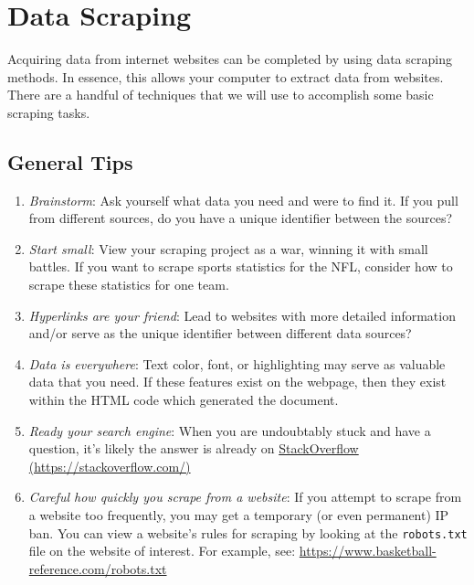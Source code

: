 \documentclass[
  11pt,
]{book}
\theoremstyle{definition}
\theoremstyle{definition}
\theoremstyle{definition}
\theoremstyle{definition}
\theoremstyle{remark}
\begin{document}
\newpage

\hypertarget{data-scraping}{%
\section{Data Scraping}\label{data-scraping}}

Acquiring data from internet websites can be completed by using data scraping methods. In essence, this allows your computer to extract data from websites. There are a handful of techniques that we will use to accomplish some basic scraping tasks.

\hypertarget{general-tips}{%
\subsection{General Tips}\label{general-tips}}

\begin{enumerate}
\def\labelenumi{\arabic{enumi}.}
\item
  \emph{Brainstorm}: Ask yourself what data you need and were to find it. If you pull from different sources, do you have a unique identifier between the sources?
\item
  \emph{Start small}: View your scraping project as a war, winning it with small battles. If you want to scrape sports statistics for the NFL, consider how to scrape these statistics for one team.
\item
  \emph{Hyperlinks are your friend}: Lead to websites with more detailed information and/or serve as the unique identifier between different data sources?
\item
  \emph{Data is everywhere}: Text color, font, or highlighting may serve as valuable data that you need. If these features exist on the webpage, then they exist within the HTML code which generated the document.
\item
  \emph{Ready your search engine}: When you are undoubtably stuck and have a question, it's likely the answer is already on
  \href{https://stackoverflow.com/}{StackOverflow (https://stackoverflow.com/)}
\item
  \emph{Careful how quickly you scrape from a website}: If you attempt to scrape from a website too frequently, you may get a temporary (or even permanent) IP ban. You can view a website's rules for scraping by looking at the \texttt{robots.txt} file on the website of interest. For example, see: \url{https://www.basketball-reference.com/robots.txt}
\end{enumerate}
\end{document}
